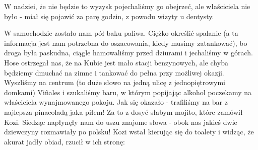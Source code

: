 W nadziei, że nie będzie to wyzysk pojechaliśmy go obejrzeć, ale właściciela nie było - miał się pojawić za parę godzin, z powodu wizyty u dentysty.
\par W samochodzie zostało nam pół baku paliwa.
Ciężko określić spalanie (a ta informacja jest nam potrzebna do oszacowania, kiedy musimy zatankować), bo droga była paskudna, ciągle hamowaliśmy przed dziurami i jechaliśmy w górach.
Hose ostrzegał nas, że na Kubie jest mało stacji benzynowych, ale chyba będziemy dmuchać na zimne i tankować do pełna przy możliwej okazji.
Wyszliśmy na centrum (to duże słowo na jedną ulicę z jednopiętrowymi domkami) Viñales i szukaliśmy baru, w którym popijając alkohol poczekamy na właściciela wynajmowanego pokoju.
Jak się okazało - trafiliśmy na bar z najlepsza pinacoladą jaka piłem!
Za to z dosyć słabym mojito, które zamówił Kozi.
Siedząc napłynęły nam do uszu znajome słowa - obok nas jakieś dwie dziewczyny rozmawiały po polsku!
Kozi wstał kierując się do toalety i widząc, że akurat jadły obiad, rzucił w ich stronę:

